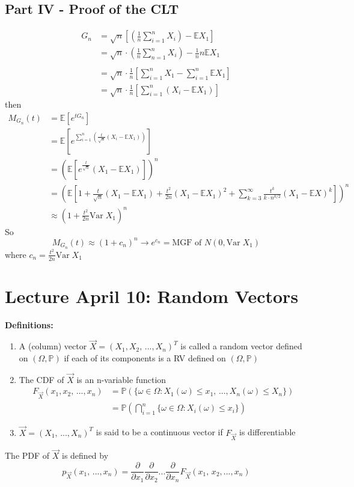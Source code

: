 \documentclass[12pt]{article}
\renewcommand{\P}{\mathbb{P}}
\newcommand{\E}{\mathbb{E}}
\newcommand{\Var}{\text{Var}\;}
\begin{document}
\subsection*{Part IV - Proof of the CLT}
\begin{align*}
    G_n &= \sqrt{n} \left[\left(\frac{1}{n}\sum_{i=1}^n X_i\right) - \E X_1\right]\\
    &= \sqrt{n} \cdot \left(\frac{1}{n}\sum_{n=1}^n X_i\right) - \frac{1}{n}n \E X_1\\\\
    &= \sqrt{n} \cdot \frac{1}{n} \left[\sum_{i=1}^n X_1 - \sum_{i=1}^n \E X_1\right]\\
    &= \sqrt{n} \cdot \frac{1}{n} \left[\sum_{i=1}^n (X_i - \E X_1)\right]
\end{align*}
then 
\begin{align*}
    M_{G_n}(t) &= \E[e^{t G_n}]\\
    &= \E [e^{\sum_{i=1}^n \left(\frac{t}{\sqrt{n}}(X_i - \E X_1)\right)}]\\
    &= \left(\E[e^{\frac{t}{\sqrt{n}}}(X_1 - \E  X_1)]\right)^n\\
    &= \left(\E \left[1 + \frac{t}{\sqrt{n}}(X_1 - \E X_1) + \frac{t^2}{2n}(X_1 - \E X_1)^2 + \sum_{k=3}^\infty \frac{t^k}{k \cdot n^{k/2}} (X_1 - \E X)^k \right]\right)^n\\
    &\approx (1 + \frac{t^2}{2n}\Var X_1)^n
\end{align*}
So 
\[M_{G_n}(t) \approx (1 + c_n)^n \to e^{c_n} = \text{MGF of } N(0, \Var X_1)\]
where $c_n = \frac{t^2}{2n}\Var X_1$

\section*{Lecture April 10: Random Vectors}
\textbf{Definitions:}
\begin{enumerate}
    \item A (column) vector $\vec{X} = (X_1, X_2, \, ..., X_n)^T$ is called a random vector defined on $(\Omega, \P)$ if each of its components is a RV defined on $(\Omega, \P)$
    \item The CDF of $\vec{X}$ is an n-variable function 
    \begin{align*}
        F_{\vec{X}}(x_1, x_2,\, ..., x_n) &= \P(\{\omega \in \Omega: X_1(\omega) \leq x_1, \, ..., X_n(\omega) \leq X_n\})
        \\
        &= \P\left(\bigcap_{i=1}^n \{\omega \in \Omega: X_i(\omega) \leq x_i\}\right)
    \end{align*}
    \item $\vec{X} = (X_1,\, ..., X_n)^T$ is said to be a continuous vector if $F_{\vec{X}}$ is differentiable
\end{enumerate}
The PDF of $\vec{X}$ is defined by 
\[p_{\vec{X}}(x_1,\, ..., x_n) = \frac{\partial}{\partial x_1} \frac{\partial}{\partial x_2} ...\frac{\partial}{\partial x_n} F_{\vec{X}}(x_1,\, x_2, ..., x_n)\]
\end{document}
